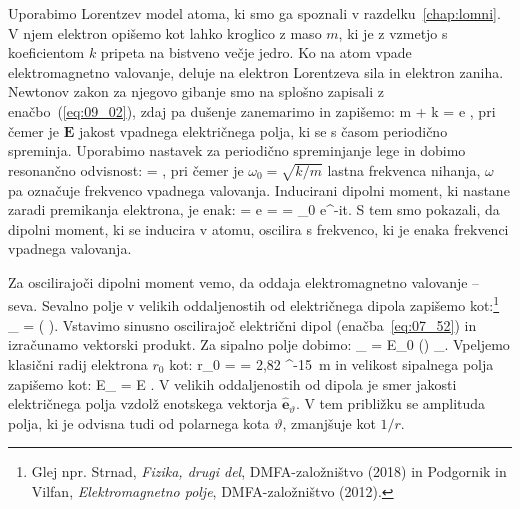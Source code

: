 Uporabimo Lorentzev model atoma, ki smo ga spoznali v razdelku~\ref{chap:lomni}.
V njem elektron opišemo kot lahko kroglico z maso $m$, ki je z vzmetjo 
s koeficientom $k$ pripeta na bistveno večje jedro. Ko
na atom vpade elektromagnetno valovanje, deluje na elektron 
Lorentzeva sila in elektron zaniha. 
Newtonov zakon za njegovo gibanje smo na splošno zapisali z enačbo~(\ref{eq:09_02}), 
zdaj pa dušenje zanemarimo in zapišemo:
\beq
m  + k  = e ,
\label{eq:07_50}
\eeq
pri čemer je $\mathbf{E}$ jakost 
vpadnega električnega polja, ki se s časom periodično spreminja. Uporabimo nastavek 
za periodično spreminjanje lege in dobimo resonančno odvisnost:
\beq
{} = ,
\label{eq:07_51}
\eeq
pri čemer je $\omega_0 = \sqrt{k/m}$ lastna frekvenca nihanja, $\omega$ pa označuje
frekvenco vpadnega valovanja. Inducirani dipolni moment, ki nastane zaradi premikanja elektrona, 
je enak:
\beq
{} = e =  = 
_0 e^{-i\omega t}.
\label{eq:07_52}
\eeq
S tem smo pokazali, da dipolni moment, ki se inducira v atomu, oscilira s frekvenco, 
ki je enaka frekvenci vpadnega valovanja.

Za oscilirajoči dipolni moment vemo, da oddaja elektromagnetno valovanje -- seva. 
Sevalno polje v velikih oddaljenostih od električnega dipola zapišemo 
kot:\footnote{Glej npr. Strnad, {\it Fizika, drugi del}, DMFA-založništvo (2018) in
Podgornik in Vilfan, {\it Elektromagnetno polje}, DMFA-založništvo (2012).}
\beq
{}_ = 
\left( \times {}\right)\times {}.
\label{eq:07_12}
\eeq
Vstavimo sinusno oscilirajoč električni dipol (enačba~\ref{eq:07_52}) 
in izračunamo vektorski produkt. Za sipalno polje dobimo:
\beq
{}_ = 
E_0
\sin \vartheta \left(\right) _\vartheta.
\label{eq:dipolE}
\eeq
Vpeljemo klasični radij elektrona $r_0$ kot:
\beq
r_0 =  = 2,82 ^{-15}~\si{m}
\label{eq:07_53}
\eeq
in velikost sipalnega polja zapišemo kot:
\beq
E_ = E \sin \vartheta.
\label{eq:07_54}
\eeq
V velikih oddaljenostih od dipola je smer jakosti električnega polja vzdolž enotskega
vektorja $\hat{\mathbf{e}}_\vartheta$. V tem približku se amplituda polja, ki 
je odvisna tudi od polarnega kota $\vartheta$, zmanjšuje kot $1/r$.  

